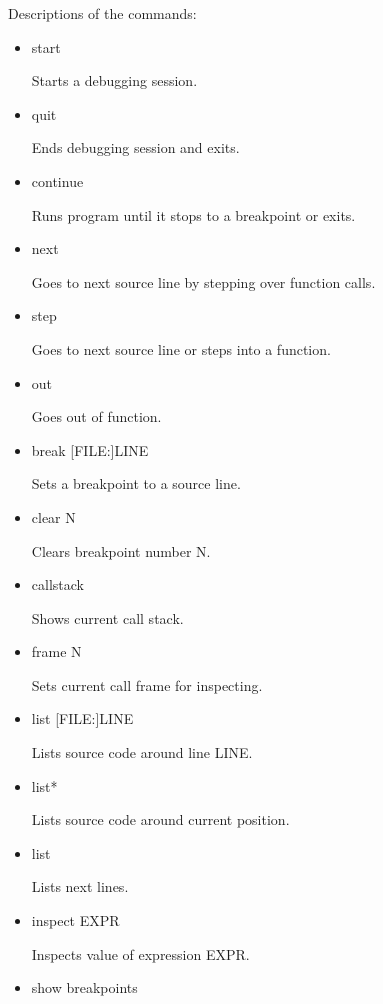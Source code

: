 \documentclass[oneside, a4paper, 11pt]{article}
\begin{document}
Descriptions of the commands:

\begin{itemize}

\item start

Starts a debugging session.

\item quit

Ends debugging session and exits.

\item continue

Runs program until it stops to a breakpoint or exits.

\item next

Goes to next source line by stepping over function calls.

\item step

Goes to next source line or steps into a function.

\item out

Goes out of function.

\item break [FILE:]LINE

Sets a breakpoint to a source line.

\item clear N

Clears breakpoint number N.

\item callstack

Shows current call stack.

\item frame N

Sets current call frame for inspecting.

\item list [FILE:]LINE

Lists source code around line LINE.

\item list*

Lists source code around current position.

\item list

Lists next lines.

\item inspect EXPR

Inspects value of expression EXPR.

\item show breakpoints


\end{itemize}
\end{document}

